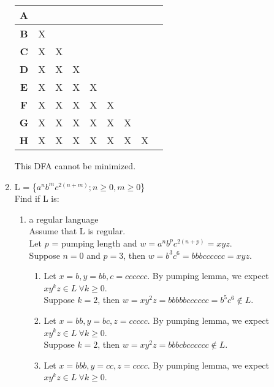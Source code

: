 \documentclass[10.5pt,letterpaper]{article}
\begin{document}
\begin{enumerate}[label=\textbf{Problem \arabic*.}]
\begin{tabular}{|c|c|c|c|c|c|c|c|c|}
\hline
\textbf{A} &\cellcolor{blue!25}&\cellcolor{blue!25}&\cellcolor{blue!25}&\cellcolor{blue!25}&\cellcolor{blue!25}&\cellcolor{blue!25}&\cellcolor{blue!25}&\cellcolor{blue!25}\\
\hline
\textbf{B} & X &\cellcolor{blue!25}&\cellcolor{blue!25}&\cellcolor{blue!25}&\cellcolor{blue!25}&\cellcolor{blue!25}&\cellcolor{blue!25}&\cellcolor{blue!25}\\
\hline
\textbf{C} & X & X &\cellcolor{blue!25}&\cellcolor{blue!25}&\cellcolor{blue!25}&\cellcolor{blue!25}&\cellcolor{blue!25}&\cellcolor{blue!25}\\
\hline
\textbf{D} & X & X & X &\cellcolor{blue!25}&\cellcolor{blue!25}&\cellcolor{blue!25}&\cellcolor{blue!25}&\cellcolor{blue!25}\\
\hline
\textbf{E} & X & X & X & X &\cellcolor{blue!25}&\cellcolor{blue!25}&\cellcolor{blue!25}&\cellcolor{blue!25}\\
\hline
\textbf{F} & X & X & X & X & X &\cellcolor{blue!25}&\cellcolor{blue!25}&\cellcolor{blue!25}\\
\hline
\textbf{G} & X & X & X & X & X & X &\cellcolor{blue!25}&\cellcolor{blue!25}\\
\hline
\textbf{H} & X & X & X & X & X & X & X &\cellcolor{blue!25}\\
\hline
\end{tabular}
This DFA cannot be minimized.
\item L = \{$a^nb^mc^{2(n+m)};n\geq0,m\geq0$\}\\
Find if L is:
	\begin{enumerate}[label=\alph*)]
	\item a regular language\\
	Assume that L is regular.\\
	Let $p$ = pumping length and $w = a^nb^pc^{2(n+p)} = xyz$.\\
	Suppose $n=0$ and $p=3$, then $w=b^3c^{6}=bbbcccccc=xyz$.
		\begin{enumerate}[label=\arabic*)]
		\item Let $x=b, y=bb, c=cccccc$. By pumping lemma, we expect $xy^kz \in L \ \forall k \geq 0$.\\
		Suppose $k=2$, then $w=xy^2z=bbbbbcccccc=b^5c^6 \not\in L$.
		\item Let $x=bb, y=bc, z=ccccc$. By pumping lemma, we expect $xy^kz \in L \ \forall k \geq 0$.\\
		Suppose $k=2$, then $w=xy^2z=bbbcbcccccc \not\in L$.
		\item Let $x=bbb, y=cc, z=cccc$. By pumping lemma, we expect $xy^kz \in L \ \forall k \geq 0$.\\

\end{enumerate}
\end{enumerate}
\end{enumerate}
\end{document}

